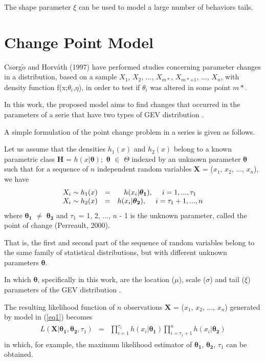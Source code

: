 \documentclass{asaproc}
\begin{document}
The shape parameter $\xi$ can be used to model a large number of behaviors tails.

\section{Change Point Model}

Cs$\ddot{o}$rg$\tilde{o}$ and Horváth (1997) have performed studies concerning parameter changes in a distribution, based on a sample  $X_{1}$, $X_{2}$, ..., $X_{m*}$, $X_{m*+1}$, ..., $X_{n}$, with density function f(x;$\theta_{i}$,$\eta$), in order to test if $\theta_{i}$ was altered in some point $m*$.

In this work, the proposed model aims to find changes that occurred in the parameters of a serie that have two types of GEV distribution .

A simple formulation of the point change problem in a series is given as follows.

Let us assume that the densities $h_{1}(x)$ and $h_{2}(x)$ belong to a known parametric class \textbf{H} = {$h(x|\boldsymbol{\theta});$ $\boldsymbol{\theta}$ $\in$ $\Theta$} indexed by an unknown parameter $\boldsymbol{\theta}$ such that for a sequence of $n$ independent random variables \textbf{X} = ($x_{1}$, $x_{2}$, ..., $x_{n}$), we have
\begin{eqnarray}
\begin{array}{ccc}\label{eq1}
X_{i} \sim h_{1}(x) & = & h(x_{i}|\boldsymbol{\theta_{1}}), \hspace{3ex} i = 1, ..., \tau_{1}  \\
X_{i} \sim h_{2}(x) & = & h(x_{i}|\boldsymbol{\theta_{2}}), \hspace{3ex} i = \tau_{1}+1, ..., n 
\end{array}
\end{eqnarray}
where $\boldsymbol{\theta_{1}}$ $\neq$ $\boldsymbol{\theta_{2}}$ and $\tau_{1}$ = 1, 2, ..., $n$ - 1 is the unknown parameter, called the point of change (Perreault, 2000). 

That is, the first and second part of the sequence of random variables belong to the same family of statistical distributions, but with different unknown parameters $\boldsymbol{\theta}$.

In which $\boldsymbol{\theta}$, specifically in this work, are the location ($\mu$), scale ($\sigma$) and tail ($\xi$) parameters of the GEV distribution .

The resulting likelihood function of $n$ observations \textbf{X} = ($x_{1}$, $x_{2}$, ..., $x_{n}$) generated by model in (\ref{eq1}) becomes
\begin{eqnarray}
\begin{array}{ccc}\label{eq2}
L(\boldsymbol{X}|\boldsymbol{\theta_{1}}, \boldsymbol{\theta_{2}}, \tau_{1}) & = & \displaystyle\prod_{i=1}^{\tau_{1}}h(x_{i}|\boldsymbol{\theta_{1}})\displaystyle\prod_{i=\tau_{1} + 1}^{n}h(x_{i}|\boldsymbol{\theta_{2}}) \nonumber
\end{array}
\end{eqnarray}
in which, for example, the maximum likelihood estimator of $\boldsymbol{\theta_{1}}$, $\boldsymbol{\theta_{2}}$, $\tau_{1}$ can be obtained.
\end{document}
